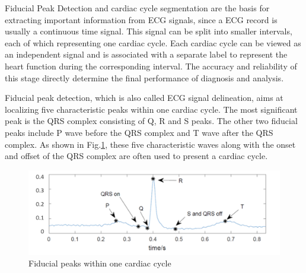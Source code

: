 Fiducial Peak Detection and cardiac cycle segmentation are the basis for extracting important information from ECG signals, since a ECG record is usually a continuous time signal. This signal can be split into smaller intervals, each of which representing one cardiac cycle. Each cardiac cycle can be viewed as an independent signal and is associated with a separate label to represent the heart function during the corresponding interval. %
The accuracy and reliability of this stage directly determine the final performance of diagnosis and analysis. 

Fiducial peak detection, which is also called ECG signal delineation, aims at localizing five characteristic peaks within one cardiac cycle. The most significant peak is the QRS complex consisting of Q, R and S peaks. The other two fiducial peaks include P wave before the QRS complex and T wave after the QRS complex. As shown in Fig.\ref{fig:fiducial_peaks}, these five characteristic waves along with the onset and offset of the QRS complex are often used to present a cardiac cycle.

 \begin{figure}[thpb]
 	\centering
 	\includegraphics[scale=0.7]{Fig/fiducial_peaks2.png}  
 	\caption{Fiducial peaks within one cardiac cycle}
 	\label{fig:fiducial_peaks}
 \end{figure}
 

